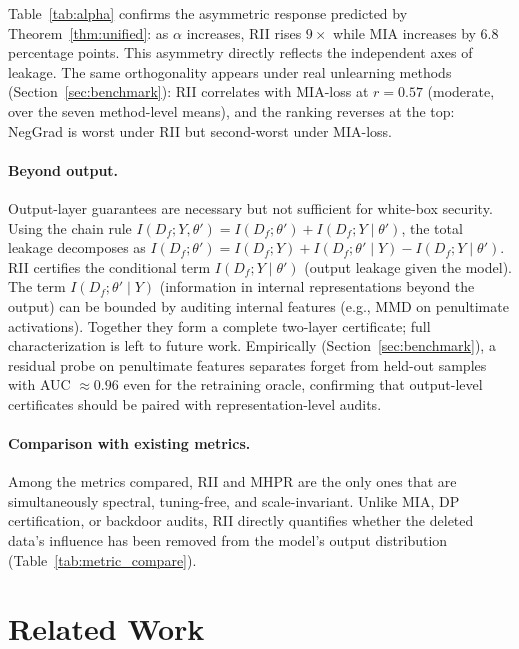 \documentclass[smallextended]{svjour3}       %
\begin{document}
Table~\ref{tab:alpha} confirms the asymmetric response predicted by Theorem~\ref{thm:unified}: as $\alpha$ increases, RII rises $9\times$ while MIA increases by 6.8 percentage points. This asymmetry directly reflects the independent axes of leakage. The same orthogonality appears under real unlearning methods (Section~\ref{sec:benchmark}): RII correlates with MIA-loss at $r{=}0.57$ (moderate, over the seven method-level means), and the ranking reverses at the top: NegGrad is worst under RII but second-worst under MIA-loss.


\paragraph{Beyond output.}
Output-layer guarantees are necessary but not sufficient for white-box security. Using the chain rule $I(D_f;Y,\theta') = I(D_f;\theta') + I(D_f;Y\mid\theta')$, the total leakage decomposes as $I(D_f;\theta') = I(D_f;Y) + I(D_f;\theta'\mid Y) - I(D_f;Y\mid\theta')$. RII certifies the conditional term $I(D_f;Y\mid\theta')$ (output leakage given the model). The term $I(D_f;\theta'\mid Y)$ (information in internal representations beyond the output) can be bounded by auditing internal features (e.g., MMD on penultimate activations). Together they form a complete two-layer certificate; full characterization is left to future work. Empirically (Section~\ref{sec:benchmark}), a residual probe on penultimate features separates forget from held-out samples with AUC ${\approx}0.96$ even for the retraining oracle, confirming that output-level certificates should be paired with representation-level audits.

\paragraph{Comparison with existing metrics.}
Among the metrics compared, RII and MHPR are the only ones that are simultaneously spectral, tuning-free, and scale-invariant. Unlike MIA, DP certification, or backdoor audits, RII directly quantifies whether the deleted data's influence has been removed from the model's output distribution (Table~\ref{tab:metric_compare}).

\section{Related Work}
\label{sec:related}
\end{document}
